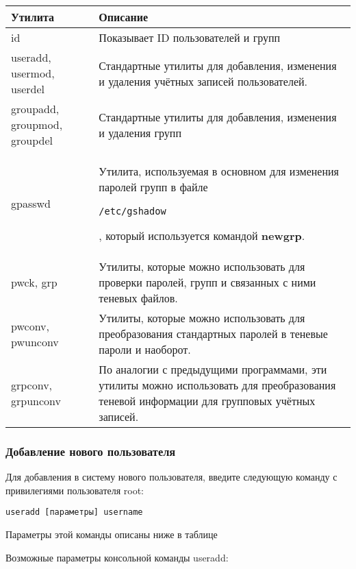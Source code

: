 \documentclass[a4paper,10pt,twoside]{article}
\begin{document}
\begin{longtable}{  m{5cm}  m{15cm}  }  
 \textbf{Утилита} & \textbf{Описание}\\\hline
 id & Показывает ID пользователей и групп\\
 useradd, usermod, userdel & Стандартные утилиты для добавления, изменения и удаления учётных записей пользователей.\\
 groupadd, groupmod, groupdel & Стандартные утилиты для добавления, изменения и удаления групп\\
 gpasswd & Утилита, используемая в основном для изменения паролей групп в файле \begin{verbatim}/etc/gshadow\end{verbatim}, который используется командой \textbf{newgrp}.\\
 pwck, grp & Утилиты, которые можно использовать для проверки паролей, групп и связанных с ними теневых файлов.\\
 pwconv, pwunconv & Утилиты, которые можно использовать для преобразования стандартных паролей в теневые пароли и наоборот.\\
 grpconv, grpunconv & По аналогии с предыдущими программами, эти утилиты можно использовать для преобразования теневой информации для групповых учётных записей.
\end{longtable}

\subsubsection{Добавление нового пользователя}
Для добавления в систему нового пользователя, введите следующую команду с привилегиями пользователя root:
\begin{verbatim}
useradd [параметры] username
\end{verbatim} 
Параметры этой команды описаны ниже в таблице

Возможные параметры консольной команды useradd:
\end{document}
